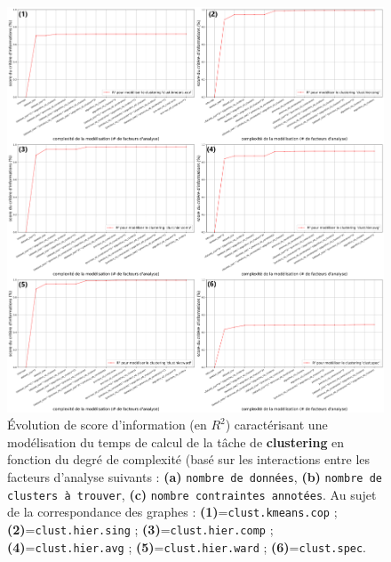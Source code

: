 			\begin{figure}[H]
				\centering
				\includegraphics[width=\textwidth]{figures/etude-temps-calcul-analyse-facteurs-3clust}
				\caption{Évolution de score d'information (en \(R^2\)) caractérisant une modélisation du temps de calcul de la tâche de \textbf{clustering} en fonction du degré de complexité (basé sur les interactions entre les facteurs d'analyse suivants : \textbf{(a)} \texttt{nombre de données}, \textbf{(b)} \texttt{nombre de clusters à trouver}, \textbf{(c)} \texttt{nombre contraintes annotées}. Au sujet de la correspondance des graphes : \textbf{(1)}=\texttt{clust.kmeans.cop} ; \textbf{(2)}=\texttt{clust.hier.sing} ; \textbf{(3)}=\texttt{clust.hier.comp} ; \textbf{(4)}=\texttt{clust.hier.avg} ; \textbf{(5)}=\texttt{clust.hier.ward} ; \textbf{(6)}=\texttt{clust.spec}.}
				\label{figure:4.3.1-ETUDE-COUTS-TEMPS-CALCUL-ANALYSE-FACTEURS-CLUSTERING}
			\end{figure}
		
